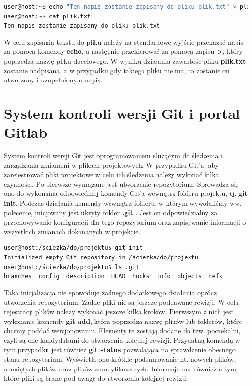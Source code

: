 \begin{lstlisting}[label={lis:zapisDoPliku},language=bash,style=Cmd,caption={Przykład zapisu tekstu do pliku}]
user@host:~$ echo "Ten napis zostanie zapisany do pliku plik.txt" > plik.txt
user@host:~$ cat plik.txt
Ten napis zostanie zapisany do pliku plik.txt
\end{lstlisting}

W celu zapisania tekstu do pliku należy na standardowe wyjście przekazać napis za pomocą komendy \textbf{echo}, a następnie przekierować za pomocą zapisu \textbf{>}, który poprzedza nazwę pliku docelowego. W wyniku działania zawartośc pliku \textbf{plik.txt} zostanie nadpisana, a w przypadku gdy takiego pliku nie ma, to zostanie on utworzony i uzupełniony o napis.\par


\section{System kontroli wersji Git i portal Gitlab}
System kontroli wersji Git jest oprogramowaniem służącym do śledzenia i zarządzania zmianami w plikach projektowych. W przypadku Git'a, aby zarejestrować pliki projektowe w celu ich śledzenia należy wykonać kilka czynności. Po pierwsze wymagane jest utworzenie repozytorium. Sprowadza się ono do wykonania odpowiedniej komendy Git'a wewnątrz folderu projektu, tj. \textbf{git init}. Podczas działania komendy wewnątrz folderu, w którym wywołaliśmy ww. polecenie, inicjowany jest ukryty folder \textbf{.git}
. Jest on odpowiedzialny za przechowywanie konfiguracji dla tego repozytorium oraz zapisywanie informacji o wszystkich zmianach dokonanych w projekcie.

\begin{lstlisting}[language=bash,style=Cmd,caption={Inicjalizacja repozytorium git}]
user@host:/ścieżka/do/projektu$ git init
Initialized empty Git repository in /ściezka/do/projektu
user@host:/ściezka/do/projektu$ ls .git
branches  config  description  HEAD  hooks  info  objects  refs
\end{lstlisting}

Taka inicjalizacja nie spowoduje żadnego dodatkowego działania oprócz utworzenia repozytorium. Żadne pliki nie są jeszcze poddawane rewizji. W celu rejestracji plików należy wykonać jeszcze kilka kroków. Pierwszym z nich jest wykonanie komendy \textbf{git add}, która poprzedza nazwę plików lub folderów, które chcemy poddać wersjonowaniu. Elementy te zostają dodane do tzw. poczekalni, czyli są one kandydatami do utworzenia kolejnej rewizji. Przydatną komendą w tym przypadku jest również \textbf{git status} pozwalająca na sprawdzenie obecnego stanu repozytorium. Wyświetla ono krótkie podsumowanie nt. nowych plików, usuniętych plików oraz plików zmodyfikowanych. Informuje nas również o tym, które pliki są brane pod uwagę do utworzenia kolejnej rewizji.

